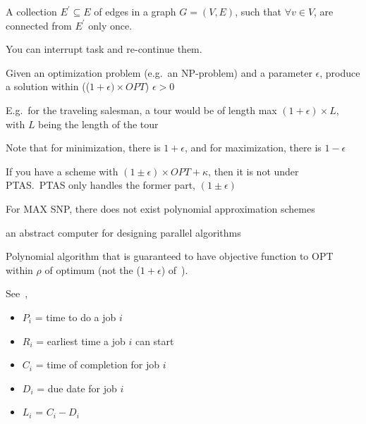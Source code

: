 \begin{definition}
    A collection $E^{\prime} \subseteq E$ of edges in a graph 
    $G = (V,E)$, such that $\forall v \in V$, are connected 
    from $E^{\prime}$ only once.
\end{definition}


\begin{definition}\label{pre-emptive}
    You can interrupt task and re-continue them.
\end{definition}


\begin{definition}\label{PTAS}
    Given an optimization problem (e.g.\ an NP-problem) and a parameter 
    $\epsilon$, produce a solution within (($1 + \epsilon) \times OPT$)
    $\epsilon > 0$

    E.g.\ for the traveling salesman, a tour would be of length max 
    $(1 + \epsilon) \times L$, with $L$ being the length of the tour

    Note that for minimization, there is $1 + \epsilon$, and for maximization,
    there is $1 - \epsilon$
    
    If you have a scheme with $(1 \pm \epsilon) \times OPT + \kappa$, then 
    it is not under PTAS.\ PTAS only handles the former part, $(1 \pm \epsilon)$

    For MAX SNP, there does not exist polynomial approximation schemes
\end{definition}

\begin{definition}
    an abstract computer for designing parallel algorithms

\end{definition}

\begin{definition}
    Polynomial algorithm that is guaranteed to have objective function
    to OPT within $\rho$ of
    optimum (not the ($1 + \epsilon$) of~).
\end{definition}

\begin{definition}[Scheduling]
    See~,
    \begin{itemize}
        \item \textbf{$P_{i}$} = time to do a job $i$
        \item \textbf{$R_{i}$} = earliest time a job $i$ can start
        \item \textbf{$C_{i}$} = time of completion for job $i$
        \item \textbf{$D_{i}$} = due date for job $i$
        \item \textbf{$L_{i}$} = $C_{i} - D_{i}$
    \end{itemize}
\end{definition}

